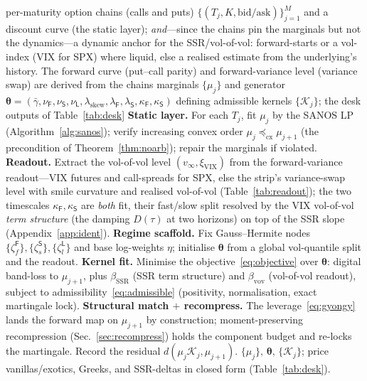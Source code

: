 \documentclass[11pt]{article}
\newcommand{\cK}{\mathcal{K}}
\newcommand{\SSR}{\mathrm{SSR}}
\newcommand{\VIX}{\mathrm{VIX}}
\newcommand{\bth}{{\boldsymbol{\theta}}}
\begin{document}
\begin{algorithm}[h]
\caption{SANOS-Evolve calibration (one pricing date).}
\label{alg:calib}
\begin{algorithmic}[1]
\Require per-maturity option chains (calls and puts) $\{(T_j,K,\text{bid/ask})\}_{j=1}^{M}$ and a discount curve (the static layer); \emph{and}---since the chains pin the marginals but not the dynamics---a dynamic anchor for the SSR/vol-of-vol: forward-starts or a vol-index (VIX for SPX) where liquid, else a realised estimate from the underlying's history. The forward curve (put--call parity) and forward-variance level (variance swap) are derived from the chains
\Ensure marginals $\{\mu_j\}$ and generator $\bth=(\bar\gamma,\nu_{\mathsf{F}},\nu_{\mathsf{S}},\nu_{\mathsf{L}},\lambda_{\mathrm{skew}},\lambda_{\mathsf{F}},\lambda_{\mathsf{S}},\kappa_{\mathsf{F}},\kappa_{\mathsf{S}})$ defining admissible kernels $\{\cK_j\}$; the desk outputs of Table~\ref{tab:desk}
\State \textbf{Static layer.} For each $T_j$, fit $\mu_j$ by the SANOS LP (Algorithm~\ref{alg:sanos}); verify increasing convex order $\mu_j\preceq_{\mathrm{cx}}\mu_{j+1}$ (the precondition of Theorem~\ref{thm:noarb}); repair the marginals if violated.
\State \textbf{Readout.} Extract the vol-of-vol level $(v_\infty,\xi_{\VIX})$ from the forward-variance readout---VIX futures and call-spreads for SPX, else the strip's variance-swap level with smile curvature and realised vol-of-vol (Table~\ref{tab:readout}); the two timescales $\kappa_{\mathsf{F}},\kappa_{\mathsf{S}}$ are \emph{both} fit, their fast/slow split resolved by the VIX vol-of-vol \emph{term structure} (the damping $D(\tau)$ at two horizons) on top of the SSR slope (Appendix~\ref{app:ident}).
\State \textbf{Regime scaffold.} Fix Gauss--Hermite nodes $\{\zeta^{\mathsf{F}}_f\},\{\zeta^{\mathsf{S}}_s\},\{\zeta^{\mathsf{L}}_l\}$ and base log-weights $\eta$; initialise $\bth$ from a global vol-quantile split and the readout.
  \Repeat
    \State \textbf{Kernel fit.} Minimise the objective~\eqref{eq:objective} over $\bth$: digital band-loss to $\mu_{j+1}$, plus $\beta_{\SSR}$ (SSR term structure) and $\beta_{\mathrm{vov}}$ (vol-of-vol readout), subject to admissibility~\eqref{eq:admissible} (positivity, normalisation, exact martingale lock). 
    \State \textbf{Structural match $+$ recompress.} The leverage~\eqref{eq:gyongy} lands the forward map on $\mu_{j+1}$ by construction; moment-preserving recompression (Sec.~\ref{sec:recompress}) holds the component budget and re-locks the martingale. Record the residual $d(\mu_j\cK_j,\mu_{j+1})$.
\EndFor
\State \Return $\{\mu_j\},\,\bth,\,\{\cK_j\}$; price vanillas/exotics, Greeks, and SSR-deltas in closed form (Table~\ref{tab:desk}).
\end{algorithmic}
\end{algorithm}
\end{document}
